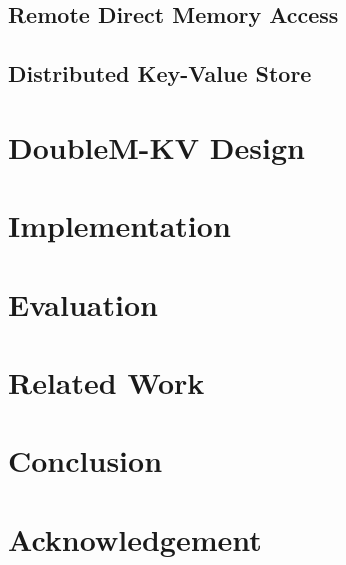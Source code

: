 \documentclass[format=acmsmall, review=false, screen=true]{acmart}
\begin{document}
	

\subsection{Remote Direct Memory Access}
	

\subsection{Distributed Key-Value Store}
	
	
	
\section{DoubleM-KV Design}



\section{Implementation}

	

\section{Evaluation}


\section{Related Work}
	

\section{Conclusion}
	
	
	
	
	
\section*{Acknowledgement}




\end{document}
